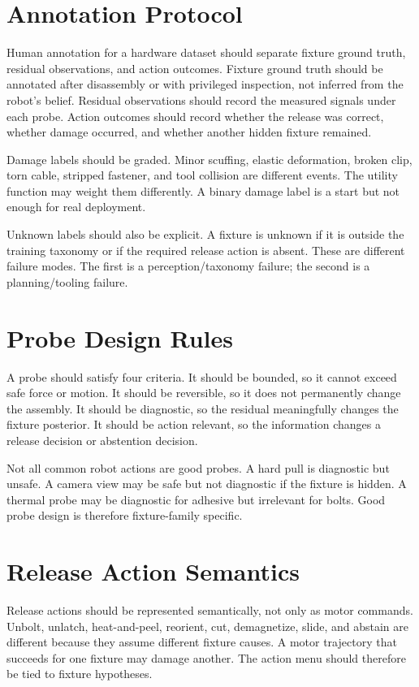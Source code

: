 \documentclass{article}
\begin{document}
\section{Annotation Protocol}

Human annotation for a hardware dataset should separate fixture ground truth,
residual observations, and action outcomes. Fixture ground truth should be
annotated after disassembly or with privileged inspection, not inferred from
the robot's belief. Residual observations should record the measured signals
under each probe. Action outcomes should record whether the release was
correct, whether damage occurred, and whether another hidden fixture remained.

Damage labels should be graded. Minor scuffing, elastic deformation, broken
clip, torn cable, stripped fastener, and tool collision are different events.
The utility function may weight them differently. A binary damage label is a
start but not enough for real deployment.

Unknown labels should also be explicit. A fixture is unknown if it is outside
the training taxonomy or if the required release action is absent. These are
different failure modes. The first is a perception/taxonomy failure; the second
is a planning/tooling failure.

\section{Probe Design Rules}

A probe should satisfy four criteria. It should be bounded, so it cannot exceed
safe force or motion. It should be reversible, so it does not permanently
change the assembly. It should be diagnostic, so the residual meaningfully
changes the fixture posterior. It should be action relevant, so the
information changes a release decision or abstention decision.

Not all common robot actions are good probes. A hard pull is diagnostic but
unsafe. A camera view may be safe but not diagnostic if the fixture is hidden.
A thermal probe may be diagnostic for adhesive but irrelevant for bolts. Good
probe design is therefore fixture-family specific.

\section{Release Action Semantics}

Release actions should be represented semantically, not only as motor
commands. Unbolt, unlatch, heat-and-peel, reorient, cut, demagnetize, slide,
and abstain are different because they assume different fixture causes. A
motor trajectory that succeeds for one fixture may damage another. The action
menu should therefore be tied to fixture hypotheses.
\end{document}

